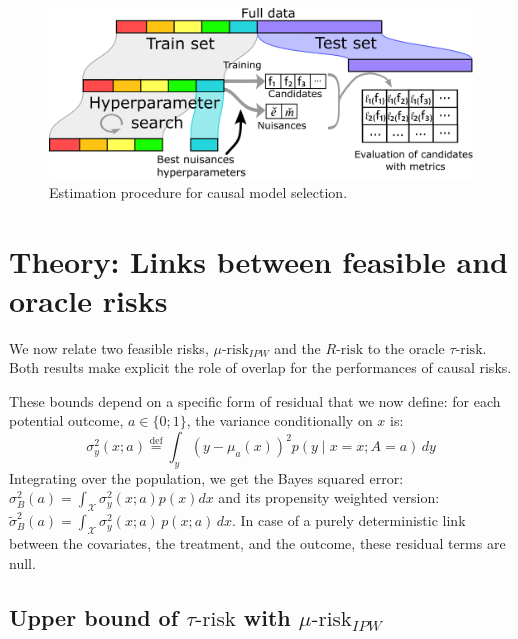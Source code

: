 \documentclass[10pt]{article}
\begin{document}
\begin{multicols}{2}
\begin{algorithm}[!htbp]
{        }
    \end{algorithm}


    \begin{figure}[h!]
        \centering
        \includegraphics[width=0.7\linewidth]{images/estimation_procedure_causal_selection_procedure.png}
        \caption{Estimation procedure for causal model
            selection.}\label{problem:estimation_procedure:figure}
    \end{figure}

    \section{Theory: Links between feasible and oracle risks}\label{sec:theory}

    We now relate two feasible risks, $\mu \text{-risk}_{IPW}$ and the
    $R\text{-risk}$ to the oracle $\tau\text{-risk}$. Both results make
    explicit the role of overlap for the performances of causal risks.

    These bounds depend on a specific form of residual that we now define: for each potential outcome, $a \in  \{0; 1\}$, the variance conditionally on $x$
    is\cite{shalit_estimating_2017}:
    \begin{equation*}\label{eq:residuals}
        \sigma_{y}^{2}(x ; a) \overset{\text{def}}{=}
        \int_{y}\left(y-\mu_{a}(x)\right)^{2} p(y \mid x=x ; A=a) \, d y
    \end{equation*}
    Integrating over the population, we get the Bayes squared error:
    $\sigma^2_{B}(a) = \int_{\mathcal X} \sigma_y^2(x;a) p(x)dx$
    and its propensity weighted version:
    $\tilde{\sigma}^2_{B}(a) = \int_{\mathcal X}\sigma_y^2(x;a)\,  p(x;
        a)\,dx$. In case of a purely deterministic link between the
    covariates, the treatment, and the outcome, these residual terms are null.


    \subsection{Upper bound of $\tau\text{-risk}$ with
        $\mu\text{-risk}_{IPW}$}\label{theory:mu_risk_ipw_bound}


\end{multicols}
\end{document}
